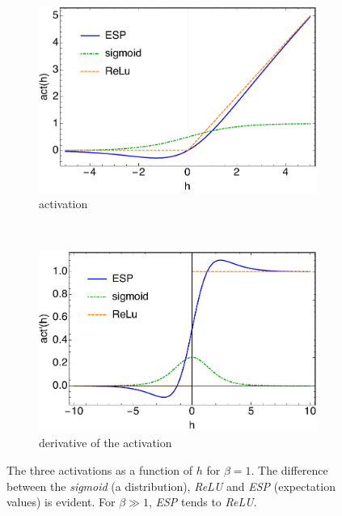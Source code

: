 \documentclass[5p]{elsarticle}
\begin{document}
\begin{figure}[t!]
    \centering
    \begin{subfigure}[b]{0.33 \textwidth}
        \includegraphics[width= \textwidth]{activations.pdf}
        \caption{activation}
        \label{fig:activation}
    \end{subfigure}
    ~
    \begin{subfigure}[b]{0.34 \textwidth}
        \includegraphics[width=\textwidth]{act.pdf}
        \caption{derivative of the activation}
        \label{fig:gradact}
    \end{subfigure}
\caption{\label{fig:activations} The three activations as a function of $h$ for $\beta=1$. The difference between the {\it sigmoid} (a distribution), {\it ReLU} and {\it ESP} (expectation values) is evident. For $\beta \gg 1$, {\it ESP} tends to {\it ReLU}.  }
\end{figure}
%
\end{document}
